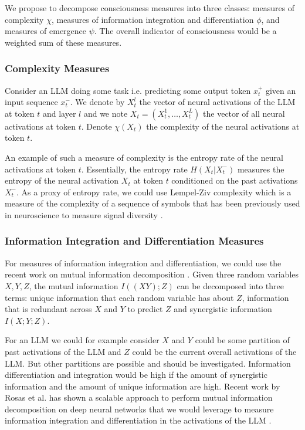 \documentclass[11pt,a4paper]{article}
\begin{document}
We propose to decompose consciousness measures into three classes: measures of complexity $\chi$, measures of information integration and differentiation $\phi$, and measures of emergence $\psi$. The overall indicator of consciousness would be a weighted sum of these measures.

\subsubsection{Complexity Measures}

Consider an LLM doing some task i.e. predicting some output token $x_t^+$ given an input sequence $x_t^-$. We denote by $X_t^l$ the vector of neural activations of the LLM at token $t$ and layer $l$ and we note $X_t = (X_t^1, \ldots, X_t^L)$ the vector of all neural activations at token $t$. Denote $\chi(X_t)$ the complexity of the neural activations at token $t$. 

An example of such a measure of complexity is the entropy rate of the neural activations at token $t$. Essentially, the entropy rate $H(X_t | X_t^-)$ measures the entropy of the neural activation $X_t$ at token $t$ conditioned on the past activations $X_t^-$. As a proxy of entropy rate, we could use Lempel-Ziv complexity which is a measure of the complexity of a sequence of symbols that has been previously used in neuroscience to measure signal diversity \citep{Schartner2015}.

\subsubsection{Information Integration and Differentiation Measures}

For measures of information integration and differentiation, we could use the recent work on mutual information decomposition \citep{Williams2010, Rosas2024}. Given three random variables $X, Y, Z$, the mutual information $I((X Y);Z)$ can be decomposed into three terms: unique information that each random variable has about $Z$, information that is redundant across $X$ and $Y$ to predict $Z$ and synergistic information $I(X; Y; Z)$. 

For an LLM we could for example consider $X$ and $Y$ could be some partition of past activations of the LLM and $Z$ could be the current overall activations of the LLM. But other partitions are possible and should be investigated. Information differentiation and integration would be high if the amount of synergistic information and the amount of unique information are high. Recent work by Rosas et al. has shown a scalable approach to perform mutual information decomposition on deep neural networks that we would leverage to measure information integration and differentiation in the activations of the LLM \citep{Rosas2024}.
\end{document}
